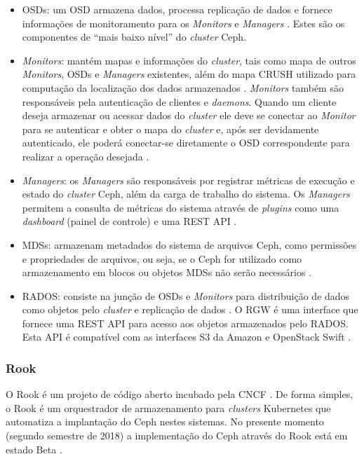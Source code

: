\begin{itemize}
    \item \ac{OSD}s: um \ac{OSD} armazena dados, processa replicação de dados e fornece informações de monitoramento para os \textit{Monitors} e \textit{Managers} \cite{aboutceph}. Estes são os componentes de ``mais baixo nível'' do \textit{cluster} Ceph.
    \item \textit{Monitors}: mantém mapas e informações do \textit{cluster}, tais como mapa de outros \textit{Monitors}, \ac{OSD}s e \textit{Managers} existentes, além do mapa \ac{CRUSH} utilizado para computação da localização dos dados armazenados \cite{aboutceph}. \textit{Monitors} também são responsáveis pela autenticação de clientes e \textit{daemons}. Quando um cliente deseja armazenar ou acessar dados do \textit{cluster} ele deve se conectar ao \textit{Monitor} para se autenticar e obter o mapa do \textit{cluster} e, após ser devidamente autenticado, ele poderá conectar-se diretamente o \ac{OSD} correspondente para realizar a operação desejada \cite{cephArchitecture}.
    \item \textit{Managers}: os \textit{Managers} são responsáveis por registrar métricas de execução e estado do \textit{cluster} Ceph, além da carga de trabalho do sistema. Os \textit{Managers} permitem a consulta de métricas do sistema através de \textit{plugins} como uma \textit{dashboard} (painel de controle) e uma \ac{REST} \ac{API} \cite{aboutceph}.
    \item \ac{MDS}s: armazenam metadados do sistema de arquivos Ceph, como permissões e propriedades de arquivos, ou seja, se o Ceph for utilizado como armazenamento em blocos ou objetos \ac{MDS}s não serão necessários \cite{aboutceph}.
    \item \ac{RADOS}: consiste na junção de \ac{OSD}s e \textit{Monitors} para distribuição de dados como objetos pelo \textit{cluster} e replicação de dados \cite{openstackCephBlock}. O \ac{RGW} é uma interface que fornece uma \ac{REST} \ac{API} para acesso aos objetos armazenados pelo \ac{RADOS}. Esta \ac{API} é compatível com as interfaces S3 da Amazon e OpenStack Swift \cite{cephRadosGW}.
\end{itemize}

\subsubsection{Rook}

O Rook é um projeto de código aberto incubado pela \ac{CNCF} \cite{rookincubator}. De forma simples, o Rook é um orquestrador de armazenamento para \textit{clusters} Kubernetes que automatiza a implantação do Ceph nestes sistemas. No presente momento (segundo semestre de 2018) a implementação do Ceph através do Rook está em estado Beta \cite{rookdocumentation}.

